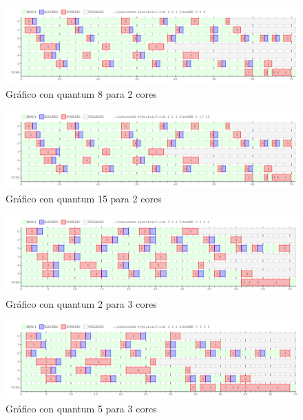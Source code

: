 \documentclass[a4paper,11pt]{article}
\begin{document}
\begin{figure}[H]
\centering
\includegraphics[scale=.6, width=1\textwidth]{graficos/ej7-2core-q3}
\caption{Gráfico con quantum 8 para 2 cores}
\end{figure}

\begin{figure}[H]
\centering
\includegraphics[scale=.6, width=1\textwidth]{graficos/ej7-2core-q4}
\caption{Gráfico con quantum 15 para 2 cores}
\end{figure}

\begin{figure}[H]
\centering
\includegraphics[scale=.6, width=1\textwidth]{graficos/ej7-3core-q1}
\caption{Gráfico con quantum 2 para 3 cores}
\end{figure}

\begin{figure}[H]
\centering
\includegraphics[scale=.6, width=1\textwidth]{graficos/ej7-3core-q2}
\caption{Gráfico con quantum 5 para 3 cores}
\end{figure}
\end{document}
